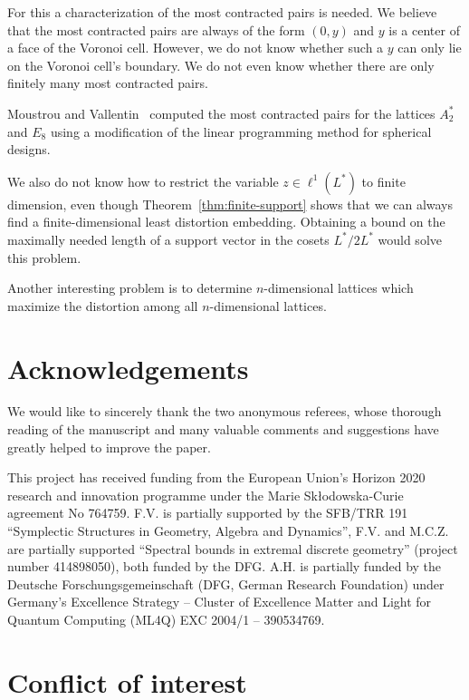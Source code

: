 \documentclass{amsart}
\begin{document}
For this a characterization of the most contracted pairs is needed. We
believe that the most contracted pairs are always of the form $(0,y)$
and $y$ is a center of a face of the Voronoi cell. However, we do not
know whether such a $y$ can only lie on the Voronoi cell's
boundary. We do not even know whether there are only finitely many
most contracted pairs.

Moustrou and Vallentin~\cite{Moustrou2023a} computed the most
contracted pairs for the lattices $A_2^*$ and $E_8$ using a
modification of the linear programming method for spherical designs.

We also do not know how to restrict the variable $z \in \ell^1(L^*)$
to finite dimension, even though Theorem~\ref{thm:finite-support}
shows that we can always find a finite-dimensional least distortion
embedding. Obtaining a bound on the maximally needed length of a
support vector in the cosets $L^*/2L^*$ would solve this problem.

Another interesting problem is to determine $n$-dimensional lattices
which maximize the distortion among all $n$-dimensional lattices.

%
%
%

\section*{Acknowledgements}

We would like to sincerely thank the two anonymous referees, whose thorough reading of the manuscript and many valuable comments and suggestions have greatly helped to improve the paper.

\smallskip

This project has received funding from the European Union's Horizon
2020 research and innovation programme under the Marie
Sk\l{}odowska-Curie agreement No 764759. F.V. is partially supported
by the SFB/TRR 191 ``Symplectic Structures in Geometry, Algebra and
Dynamics'', F.V. and M.C.Z. are partially supported ``Spectral bounds
in extremal discrete geometry'' (project number 414898050), both
funded by the DFG. A.H. is partially funded by the Deutsche Forschungsgemeinschaft (DFG, German Research Foundation) under Germany's Excellence Strategy -- Cluster of Excellence Matter and Light for Quantum Computing (ML4Q) EXC 2004/1 -- 390534769.

\section*{Conflict of interest}
\end{document}
